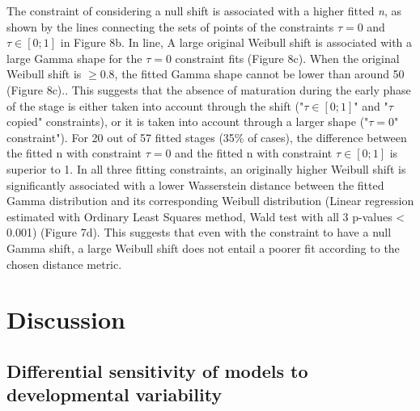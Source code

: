 \documentclass[12pt,a4paper,onecolumn]{article}
\begin{document}
\tabto{1 cm} The constraint of considering a null shift is associated with a higher fitted \textit{n}, as shown by the lines connecting the sets of points of the constraints $\tau = 0$ and $\tau \in [0;1]$ in Figure 8b. In line, A large original Weibull shift is associated with a large Gamma shape for the $\tau = 0$ constraint fits (Figure 8c). When the original Weibull shift is $\geq 0.8$, the fitted Gamma shape cannot be lower than around 50 (Figure 8c).. This suggests that the absence of maturation during the early phase of the stage is either taken into account through the shift ("$\tau \in [0;1]$" and "$\tau$ copied" constraints), or it is taken into account through a larger shape ("$\tau = 0$" constraint"). For 20 out of 57 fitted stages (35\% of cases), the difference between the fitted n with constraint $\tau = 0$ and the fitted n with constraint $\tau \in [0;1]$ is superior to 1. In all three fitting constraints, an originally higher Weibull shift is significantly associated with a lower Wasserstein distance between the fitted Gamma distribution and its corresponding Weibull distribution (Linear regression estimated with Ordinary Least Squares method, Wald test with all 3 p-values < 0.001) (Figure 7d). This suggests that even with the constraint to have a null Gamma shift, a large Weibull shift does not entail a poorer fit according to the chosen distance metric.

















\section{Discussion}
\subsection{Differential sensitivity of models to developmental variability}
\end{document}
